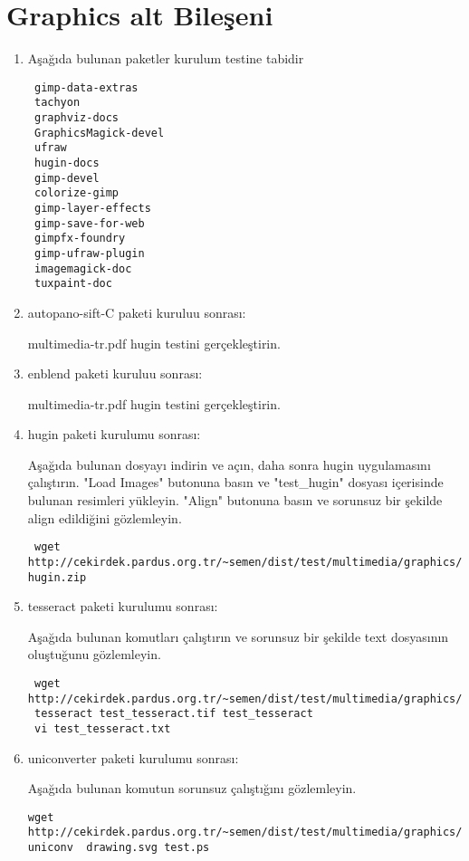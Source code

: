 \documentclass[a4paper,10pt]{article}
\begin{document}
\section{Graphics alt Bileşeni}
\begin{enumerate}
 \item Aşağıda bulunan paketler kurulum testine tabidir
\begin{verbatim}
 gimp-data-extras
 tachyon
 graphviz-docs
 GraphicsMagick-devel
 ufraw
 hugin-docs
 gimp-devel
 colorize-gimp
 gimp-layer-effects
 gimp-save-for-web
 gimpfx-foundry
 gimp-ufraw-plugin
 imagemagick-doc
 tuxpaint-doc 
\end{verbatim}
\item autopano-sift-C paketi kuruluu sonrası:

multimedia-tr.pdf hugin testini gerçekleştirin.

\item enblend paketi kuruluu sonrası:

multimedia-tr.pdf hugin testini gerçekleştirin.

\item hugin paketi kurulumu sonrası:

Aşağıda bulunan dosyayı indirin ve açın, daha sonra hugin uygulamasını çalıştırın. "Load Images" butonuna basın ve "test\_hugin" dosyası içerisinde bulunan resimleri yükleyin. "Align" butonuna basın ve sorunsuz bir şekilde align edildiğini gözlemleyin. 

\begin{verbatim}
 wget http://cekirdek.pardus.org.tr/~semen/dist/test/multimedia/graphics/test-hugin.zip
\end{verbatim}


\item tesseract paketi kurulumu sonrası:

Aşağıda bulunan komutları çalıştırın ve sorunsuz bir şekilde text dosyasının oluştuğunu gözlemleyin.
\begin{verbatim}
 wget http://cekirdek.pardus.org.tr/~semen/dist/test/multimedia/graphics/test_tesseract.tif
 tesseract test_tesseract.tif test_tesseract
 vi test_tesseract.txt
\end{verbatim}

\item uniconverter paketi kurulumu sonrası:

Aşağıda bulunan komutun sorunsuz çalıştığını gözlemleyin.
\begin{verbatim}
wget http://cekirdek.pardus.org.tr/~semen/dist/test/multimedia/graphics/drawing.svg
uniconv  drawing.svg test.ps
\end{verbatim}



\end{enumerate}
\end{document}
